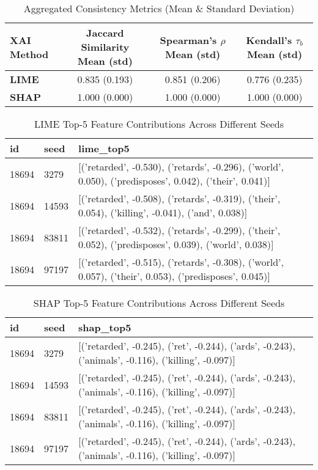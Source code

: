 \documentclass{article}
\begin{document}
\begin{table}[ht]
\centering
\caption{Aggregated Consistency Metrics (Mean \& Standard Deviation)}
\label{tab:consistency_metrics}
\begin{tabular}{lccc}
\toprule
\textbf{XAI Method} & \textbf{Jaccard Similarity Mean (std)} & \textbf{Spearman's $\rho$ Mean (std)} & \textbf{Kendall's $\tau_b$ Mean (std)} \\
\midrule
\textbf{LIME} & 0.835 (0.193) & 0.851 (0.206) & 0.776 (0.235) \\
\textbf{SHAP} & 1.000 (0.000) & 1.000 (0.000) & 1.000 (0.000) \\
\bottomrule
\end{tabular}
\end{table}

\begin{table}[ht]
\centering
\caption{LIME Top-5 Feature Contributions Across Different Seeds}
\label{tab:lime_top5_contributions}
\begin{tabular}{llp{10cm}}
\toprule
\textbf{id} & \textbf{seed} & \textbf{lime\_top5} \\
\midrule
18694 & 3279  & [('retarded', -0.530), ('retards', -0.296), ('world', 0.050), ('predisposes', 0.042), ('their', 0.041)] \\
18694 & 14593 & [('retarded', -0.508), ('retards', -0.319), ('their', 0.054), ('killing', -0.041), ('and', 0.038)] \\
18694 & 83811 & [('retarded', -0.532), ('retards', -0.299), ('their', 0.052), ('predisposes', 0.039), ('world', 0.038)] \\
18694 & 97197 & [('retarded', -0.515), ('retards', -0.308), ('world', 0.057), ('their', 0.053), ('predisposes', 0.045)] \\
\bottomrule
\end{tabular}
\end{table}

\begin{table}[ht]
\centering
\caption{SHAP Top-5 Feature Contributions Across Different Seeds}
\label{tab:shap_top5_contributions}
\begin{tabular}{llp{11cm}}
\toprule
\textbf{id} & \textbf{seed} & \textbf{shap\_top5} \\
\midrule
18694 & 3279  & [('retarded', -0.245), ('ret', -0.244), ('ards', -0.243), ('animals', -0.116), ('killing', -0.097)] \\
18694 & 14593 & [('retarded', -0.245), ('ret', -0.244), ('ards', -0.243), ('animals', -0.116), ('killing', -0.097)] \\
18694 & 83811 & [('retarded', -0.245), ('ret', -0.244), ('ards', -0.243), ('animals', -0.116), ('killing', -0.097)] \\
18694 & 97197 & [('retarded', -0.245), ('ret', -0.244), ('ards', -0.243), ('animals', -0.116), ('killing', -0.097)] \\
\bottomrule
\end{tabular}
\end{table}
\end{document}
